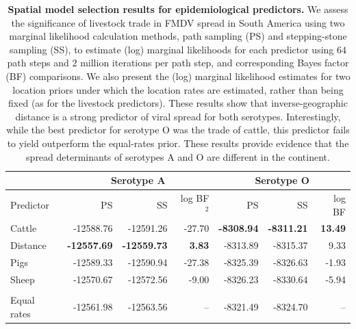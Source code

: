 \documentclass[10pt]{article}
\begin{document}
\begin{table}[H]
\caption{
\textbf{Spatial model selection results for epidemiological predictors.}
We assess the significance of livestock trade in FMDV spread in South America using two marginal likelihood calculation methods, path sampling (PS) and stepping-stone sampling (SS), to estimate (log) marginal likelihoods for each predictor using $64$ path steps and $2$ million iterations per path step, and corresponding Bayes factor (BF) comparisons.
We also present the (log) marginal likelihood estimates for two location priors under which the location rates are estimated, rather than being fixed (as for the livestock predictors).
These results show that inverse-geographic distance is a strong predictor of viral spread for both serotypes.
Interestingly, while the best predictor for serotype O was the trade of cattle, this predictor fails to yield outperform the equal-rates prior.
These results provide evidence that the spread determinants of serotypes A and O are different in the continent.
}
\begin{center}
\begin{tabular}{lrrrrrr}
\toprule
 & \multicolumn{3}{c}{Serotype A}& \multicolumn{3}{c}{Serotype O}\\
 \midrule
Predictor & PS & SS & log BF$^2$ & PS & SS & log BF \\
Cattle&-12588.76&-12591.26&-27.70&\textbf{-8308.94}&\textbf{-8311.21}& \textbf{13.49}\\
Distance&\textbf{-12557.69}&\textbf{-12559.73}&\textbf{3.83}&-8313.89&-8315.37&9.33\\
Pigs&-12589.33&-12590.94&-27.38&-8325.39&-8326.63&-1.93\\
Sheep&-12570.67&-12572.56&-9.00&-8326.23&-8330.64&-5.94\\
\\
\hline
Equal rates &-12561.98&-12563.56&--&-8321.49&-8324.70&--\\
\bottomrule
\end{tabular}
\end{center}
\begin{flushleft}
\end{flushleft}
\label{tab:preds}
 \end{table}
\newpage
\end{document}

